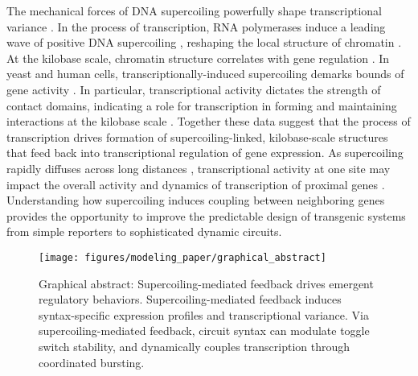 \documentclass[11pt]{article}
\begin{document}
The mechanical forces of DNA supercoiling powerfully shape transcriptional variance \parencite{desaiDNArepairPathwayCan2021,chongMechanismTranscriptionalBursting2014}.
In the process of transcription, RNA polymerases induce a leading wave of positive DNA supercoiling \parencite{wuTranscriptionGeneratesPositively1988,liuSupercoilingDNATemplate1987}, reshaping the local structure of chromatin \parencite{acharNegativeSupercoilGene2020,tevesTranscriptiongeneratedTorsionalStress2014,naughtonTranscriptionFormsRemodels2013,guoHighresolutionGenomewideMapping2021}.
At the kilobase scale, chromatin structure correlates with gene regulation \parencite{hsiehResolving3DLandscape2020,rowleyEvolutionarilyConservedPrinciples2017, krietensteinUltrastructuralDetailsMammalian2020}.
In yeast and human cells, transcriptionally-induced supercoiling demarks bounds of gene activity \parencite{acharNegativeSupercoilGene2020,naughtonTranscriptionFormsRemodels2013,kouzineTranscriptiondependentDynamicSupercoiling2013}.
In particular, transcriptional activity dictates the strength of contact domains, indicating a role for transcription in forming and maintaining interactions at the kilobase scale \parencite{rowleyOrganizationalPrinciples3D2018,rowleyEvolutionarilyConservedPrinciples2017}.
Together these data suggest that the process of transcription drives formation of supercoiling-linked, kilobase-scale structures that feed back into transcriptional regulation of gene expression.
As supercoiling rapidly diffuses across long distances \parencite{loenhoutDynamicsDNASupercoils2012}, transcriptional activity at one site may impact the overall activity and dynamics of transcription of proximal genes \parencite{sevierPropertiesGeneExpression2018, sevierCollectivePolymeraseDynamics2022,tripathiDNASupercoilingmediatedCollective2021}.
Understanding how supercoiling induces coupling between neighboring genes provides the opportunity to improve the predictable design of transgenic systems from simple reporters to sophisticated dynamic circuits.

\begin{figure}[h]
    \centering
    \texttt{[image: figures/modeling\_paper/graphical\_abstract]}
    \caption{Graphical abstract: Supercoiling-mediated feedback drives emergent regulatory behaviors. Supercoiling-mediated feedback induces syntax-specific expression profiles and transcriptional variance. Via supercoiling-mediated feedback, circuit syntax can modulate toggle switch stability, and dynamically couples transcription through coordinated bursting. } \label{fig:graphical_abstract}
\end{figure}
\end{document}
